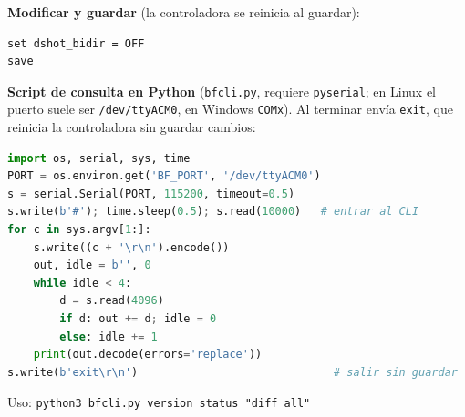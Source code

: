 \documentclass[11pt,letterpaper]{article}
\begin{document}
\noindent\textbf{Modificar y guardar} (la controladora se reinicia al guardar):
\begin{lstlisting}
set dshot_bidir = OFF
save
\end{lstlisting}

\noindent\textbf{Script de consulta en Python} (\texttt{bfcli.py}, requiere \texttt{pyserial}; en Linux el puerto suele ser \texttt{/dev/ttyACM0}, en Windows \texttt{COMx}). Al terminar envía \texttt{exit}, que reinicia la controladora sin guardar cambios:
\begin{lstlisting}[language=Python]
import os, serial, sys, time
PORT = os.environ.get('BF_PORT', '/dev/ttyACM0')
s = serial.Serial(PORT, 115200, timeout=0.5)
s.write(b'#'); time.sleep(0.5); s.read(10000)   # entrar al CLI
for c in sys.argv[1:]:
    s.write((c + '\r\n').encode())
    out, idle = b'', 0
    while idle < 4:
        d = s.read(4096)
        if d: out += d; idle = 0
        else: idle += 1
    print(out.decode(errors='replace'))
s.write(b'exit\r\n')                              # salir sin guardar
\end{lstlisting}
Uso: \texttt{python3 bfcli.py version status "diff all"}
\end{document}

